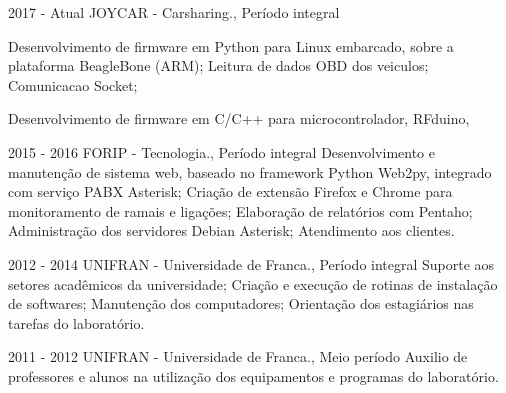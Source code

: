 

{2017 - Atual\space\space\space\space}
{JOYCAR - Carsharing., Período integral}
{
Desenvolvimento de firmware em Python para Linux embarcado, sobre a plataforma BeagleBone (ARM);
Leitura de dados OBD dos veiculos;
Comunicacao Socket;



Desenvolvimento de firmware em C/C++ para microcontrolador, RFduino,
}
\sepspace


{2015 - 2016\space\space\space\space}
{FORIP - Tecnologia., Período integral}
{Desenvolvimento e manutenção de sistema web, baseado no framework Python
Web2py, integrado com serviço PABX Asterisk; Criação de extensão Firefox e
Chrome para monitoramento de ramais e ligações; Elaboração de relatórios com
Pentaho; Administração dos servidores Debian Asterisk; Atendimento aos clientes.
}
\sepspace




{2012 - 2014\space\space\space\space\space}
{UNIFRAN - Universidade de Franca., Período integral}
{Suporte aos setores acadêmicos da universidade; Criação e execução de rotinas
de instalação de softwares; Manutenção dos computadores; Orientação dos
estagiários nas tarefas do laboratório.}
\sepspace


{2011 - 2012\space\space\space\space\space}
{UNIFRAN - Universidade de Franca., Meio período}
{Auxilio de professores e alunos na utilização dos equipamentos e programas do
laboratório.}
